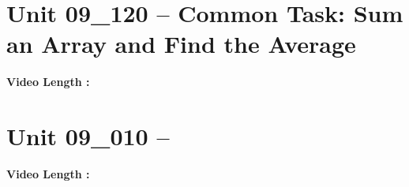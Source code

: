 \documentclass[letterpaper,12pt]{exam}
\newcommand{\unit}{Unit 09}
\begin{document}
\begin{questions}
\section*{\unit\_120 -- Common Task: Sum an Array and Find the Average} 
\par{\selectfont\textbf{Video Length :}}
\section*{\unit\_010 -- } 
\par{\selectfont\textbf{Video Length :}}





\end{questions}
\end{document}
